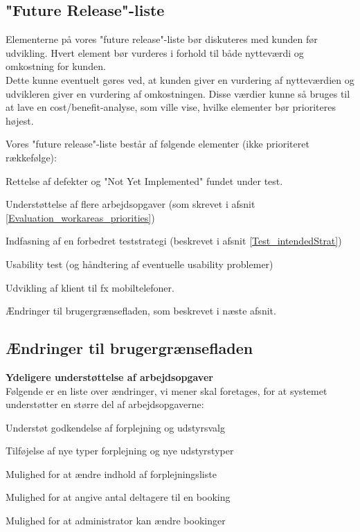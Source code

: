 \subsection*{"Future Release"-liste}
\label{Evaluation_Future_FR}
Elementerne på vores "future release"-liste bør diskuteres med kunden før udvikling. Hvert element bør vurderes i forhold til både nytteværdi og omkostning for kunden. 
\\Dette kunne eventuelt gøres ved, at kunden giver en vurdering af nytteværdien og udvikleren giver en vurdering af omkostningen. Disse værdier kunne så bruges til at lave en cost/benefit-analyse, som ville vise, hvilke elementer bør prioriteres højest.

Vores "future release"-liste består af følgende elementer (ikke prioriteret rækkefølge):
\begin{my_description}
\item[Fejlrettelse] Rettelse af defekter og "Not Yet Implemented" fundet under test.
\item[Nye arbejdsopgaver] Understøttelse af flere arbejdsopgaver (som skrevet i afsnit \ref{Evaluation_workareas_priorities})
\item[Forbedret teststrategi] Indfasning af en forbedret teststrategi (beskrevet i afsnit \ref{Test_intendedStrat})
\item[Usability Test] Usability test (og håndtering af eventuelle usability problemer)
\item[Nye platforme] Udvikling af klient til fx mobiltelefoner.
\item[Brugergrænseflade] Ændringer til brugergrænsefladen, som beskrevet i næste afsnit.
\end{my_description}

\subsection*{Ændringer til brugergrænsefladen}
\label{Evaluation_Future_GUI}
\textbf{Ydeligere understøttelse af arbejdsopgaver}
\\Følgende er en liste over ændringer, vi mener skal foretages, for at systemet understøtter en større del af arbejdsopgaverne:
\begin{my_itemize}
\item Understøt godkendelse af forplejning og udstyrsvalg
\item Tilføjelse af nye typer forplejning og nye udstyrstyper
\item Mulighed for at ændre indhold af forplejningsliste
\item Mulighed for at angive antal deltagere til en booking
\item Mulighed for at administrator kan ændre bookinger
\end{my_itemize}

